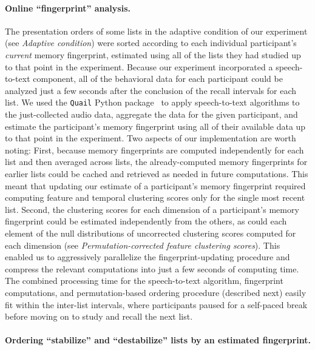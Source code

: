 \documentclass[11pt]{article}
\begin{document}
\paragraph{Online ``fingerprint'' analysis.}

The presentation orders of some lists in the adaptive condition of our
experiment (see \textit{Adaptive condition}) were sorted according to
each individual participant's \textit{current} memory fingerprint, estimated using all of the
lists they had studied up to that point in the experiment. Because our
experiment incorporated a speech-to-text component, all of the behavioral data
for each participant could be analyzed just a few seconds after the conclusion
of the recall intervals for each list. We used the \texttt{Quail} Python
package~\citep{HeusEtal17} to apply speech-to-text algorithms to the
just-collected audio data, aggregate the data for the given participant, and estimate
the participant's memory fingerprint using all of their available data up to
that point in the experiment. Two aspects of our implementation are worth
noting: First, because memory fingerprints are computed independently for each
list and then averaged across lists, the already-computed memory fingerprints
for earlier lists could be cached and retrieved as needed in future computations.
This meant that updating our estimate of a participant's memory fingerprint required
computing feature and temporal clustering scores only for the single most
recent list. Second, the clustering scores for each dimension of a participant's
memory fingerprint could be estimated independently from the others, as could
each element of the null distributions of uncorrected clustering scores computed
for each dimension (see \textit{Permutation-corrected feature clustering scores}).
This enabled us to aggressively parallelize the fingerprint-updating procedure and
compress the relevant computations into just a few seconds of computing time.
The combined processing time for the speech-to-text algorithm, fingerprint
computations, and permutation-based ordering procedure (described next) easily
fit within the inter-list intervals, where participants paused for a self-paced
break before moving on to study and recall the next list.

\paragraph{Ordering ``stabilize'' and ``destabilize'' lists by an estimated
fingerprint.}
\end{document}
